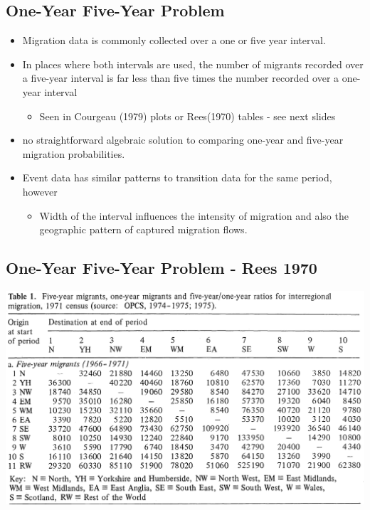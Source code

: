 \documentclass[
]{book}
\providecommand{\tightlist}{%
  \setlength{\itemsep}{0pt}\setlength{\parskip}{0pt}}
\begin{document}
\hypertarget{one-year-five-year-problem}{%
\subsection{One-Year Five-Year Problem}\label{one-year-five-year-problem}}

\begin{itemize}
\tightlist
\item
  Migration data is commonly collected over a one or five year interval.
\item
  In places where both intervals are used, the number of migrants recorded over a five-year interval is far less than five times the number recorded over a one-year interval

  \begin{itemize}
  \tightlist
  \item
    Seen in Courgeau (1979) plots or Rees(1970) tables - see next slides
  \end{itemize}
\item
  \citet{Rogerson1990} no straightforward algebraic solution to comparing one-year and five-year migration probabilities.
\item
  Event data has similar patterns to transition data for the same period, however

  \begin{itemize}
  \tightlist
  \item
    Width of the interval influences the intensity of migration and also the geographic pattern of captured migration flows.
  \end{itemize}
\end{itemize}

\hypertarget{one-year-five-year-problem---rees-1970}{%
\subsection{One-Year Five-Year Problem - Rees 1970}\label{one-year-five-year-problem---rees-1970}}

\includegraphics[width=1\linewidth]{img/rees-1977-one-five-a}
\end{document}
